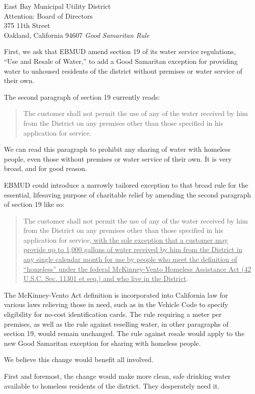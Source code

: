 \documentclass[letterpaper]{letter}
\begin{document}
\begin{letter}{%
    East Bay Municipal Utility District\\
    Attention: Board of Directors\\
    375 11th Street\\
    Oakland, California 94607}
    \stopbreaks
    \emph{Good Samaritan Rule}

    First, we ask that EBMUD amend section 19 of its water service regulations, “Use and Resale of Water,” to add a Good Samaritan exception for providing water to unhoused residents of the district without premises or water service of their own.
    \startbreaks

    The second paragraph of section 19 currently reads:

    \begin{quote}
    The customer shall not permit the use of any of the water received by him from the District on any premises other than those specified in his application for service.
    \end{quote}

    We can read this paragraph to prohibit any sharing of water with homeless people, even those without premises or water service of their own. It is very broad, and for good reason.

    EBMUD could introduce a narrowly tailored exception to that broad rule for the essential, lifesaving purpose of charitable relief by amending the second paragraph of section 19 like so:

    \begin{quote}
      The customer shall not permit the use of any of the water received by him from the District on any premises other than those specified in his application for service\ul{, with the sole exception that a customer may provide up to 1,000 gallons of water received by him from the District in any single calendar month for use by people who meet the definition of “homeless” under the federal McKinney-Vento Homeless Assistance Act (42 U.S.C. Sec. 11301 et seq.) and who live in the District}.
    \end{quote}

    The McKinney-Vento Act definition is incorporated into California law for various laws relieving those in need, such as in the Vehicle Code to specify eligibility for no-cost identification cards. The rule requiring a meter per premises, as well as the rule against reselling water, in other paragraphs of section 19, would remain unchanged. The rule against resale would apply to the new Good Samaritan exception for sharing with homeless people.

    We believe this change would benefit all involved.

    First and foremost, the change would make more clean, safe drinking water available to homeless residents of the district. They desperately need it.


\end{letter}
\end{document}
